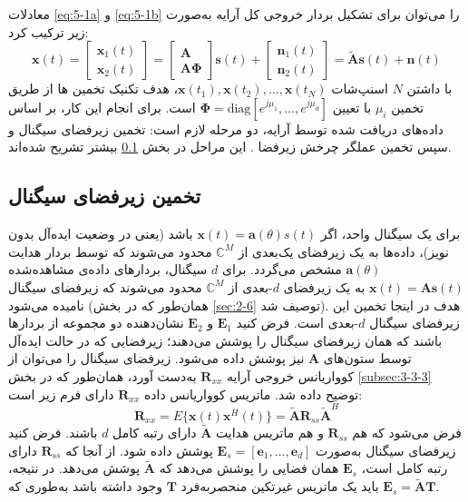 معادلات \eqref{eq:5-1a} و \eqref{eq:5-1b} را می‌توان برای تشکیل بردار خروجی کل آرایه به‌صورت زیر ترکیب کرد:
\begin{equation}
	\bm{x}(t) = \begin{bmatrix} \bm{x}_1(t) \\ \bm{x}_2(t) \end{bmatrix} = \begin{bmatrix} \bm{A} \\ \bm{A}\bm{\Phi} \end{bmatrix} \bm{s}(t) + \begin{bmatrix} \bm{n}_1(t) \\ \bm{n}_2(t) \end{bmatrix} = \tilde{\bm{A}}\bm{s}(t) + \bm{n}(t)
	\label{eq:5-2}
\end{equation}
با داشتن $N$ اسنپ‌شات $\bm{x}(t_1), \bm{x}(t_2), \dots, \bm{x}(t_N)$، هدف تکنیک  تخمین ها از طریق تخمین $\mu_i$ با تعیین $\bm{\Phi} = \text{diag}[e^{j\mu_1}, \dots, e^{j\mu_d}]$ است. برای انجام این کار، بر اساس داده‌های دریافت شده توسط آرایه، دو مرحله لازم است: تخمین زیرفضای سیگنال و سپس تخمین عملگر چرخش زیرفضا \cite{5-1, 5-2, 5-3}. این مراحل در بخش \ref{subsec:5-2-2} بیشتر تشریح شده‌اند.




\subsection{تخمین زیرفضای سیگنال}
\label{subsec:5-2-2}
برای یک سیگنال واحد، اگر $\bm{x}(t) = \bm{a}(\theta)s(t)$ باشد (یعنی در وضعیت ایده‌آل بدون نویز)، داده‌ها به یک زیرفضای یک‌بعدی از $\mathbb{C}^M$ محدود می‌شوند که توسط بردار هدایت $\bm{a}(\theta)$ مشخص می‌گردد. برای $d$ سیگنال، بردارهای داده‌ی مشاهده‌شده $\bm{x}(t) = \bm{As}(t)$ به یک زیرفضای $d$-بعدی از $\mathbb{C}^M$ محدود می‌شوند که زیرفضای سیگنال نامیده می‌شود (همان‌طور که در بخش \ref{sec:2-6} توصیف شد). هدف در اینجا تخمین این زیرفضای سیگنال $d$-بعدی است. فرض کنید $\bm{E}_1$ و $\bm{E}_2$ نشان‌دهنده دو مجموعه از بردارها باشند که همان زیرفضای سیگنال را پوشش می‌دهند؛ زیرفضایی که در حالت ایده‌آل توسط ستون‌های $\bm{A}$ نیز پوشش داده می‌شود. زیرفضای سیگنال را می‌توان از کوواریانس خروجی آرایه $\bm{R}_{xx}$ به‌دست آورد، همان‌طور که در بخش \ref{subsec:3-3-3} توضیح داده شد. ماتریس کوواریانس داده $\bm{R}_{xx}$ دارای فرم زیر است:
\begin{equation}
	\bm{R}_{xx} = E\{\bm{x}(t)\bm{x}^H(t)\} = \tilde{\bm{A}} \bm{R}_{ss} \tilde{\bm{A}}^H
	\label{eq:5-3}
\end{equation}
فرض می‌شود که هم $\bm{R}_{ss}$ و هم ماتریس هدایت $\tilde{\bm{A}}$ دارای رتبه کامل $d$ باشند. فرض کنید زیرفضای سیگنال به‌صورت $\bm{E}_s = [\bm{e}_1, \dots, \bm{e}_d]$ پوشش داده شود. از آنجا که $\bm{R}_{ss}$ دارای رتبه کامل است، $\bm{E}_s$ همان فضایی را پوشش می‌دهد که $\tilde{\bm{A}}$ پوشش می‌دهد. در نتیجه، باید یک ماتریس غیرتکین منحصربه‌فرد $\bm{T}$ وجود داشته باشد به‌طوری که $\bm{E}_s = \tilde{\bm{A}}\bm{T}$.


